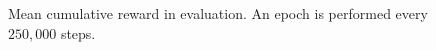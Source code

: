 \begin{figure}[t]
\begin{minipage}{\textwidth}
\begin{center}
  \hspace{1cm}
\end{center}
\end{minipage}
\caption[Pong and Breakout results]{Mean cumulative reward in evaluation. An epoch is performed every $250,000$ steps.}\label{F:atari}
\end{figure}

